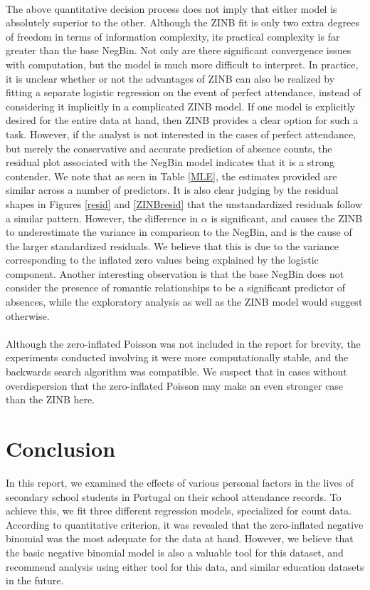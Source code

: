 \documentclass[12pt, titlepage]{article}
\begin{document}
	\paragraph{} The above quantitative decision process does not imply that either model is absolutely superior to the other. Although the ZINB fit is only two extra degrees of freedom in terms of information complexity, its practical complexity is far greater than the base NegBin. Not only are there significant convergence issues with computation, but the model is much more difficult to interpret. In practice, it is unclear whether or not the advantages of ZINB can also be realized by fitting a separate logistic regression on the event of perfect attendance, instead of considering it implicitly in a complicated ZINB model. If one model is explicitly desired for the entire data at hand, then ZINB provides a clear option for such a task. However, if the analyst is not interested in the cases of perfect attendance, but merely the conservative and accurate prediction of absence counts, the residual plot associated with the NegBin model indicates that it is a strong contender. We note that as seen in Table \ref{MLE}, the estimates provided are similar across a number of predictors. It is also clear judging by the residual shapes in Figures \ref{resid} and \ref{ZINBresid} that the unstandardized residuals follow a similar pattern.  However, the difference in $\alpha$ is significant, and causes the ZINB to underestimate the variance in comparison to the NegBin, and is the cause of the larger standardized residuals. We believe that this is due to the variance corresponding to the inflated zero values being explained by the logistic component. Another interesting observation is that the base NegBin does not consider the presence of romantic relationships to be a significant predictor of absences, while the exploratory analysis as well as the ZINB model would suggest otherwise.
	\paragraph{} Although the zero-inflated Poisson was not included in the report for brevity, the experiments conducted involving it were more computationally stable, and the backwards search algorithm was compatible. We suspect that in cases without overdispersion that the zero-inflated Poisson may make an even stronger case than the ZINB here. 
	
	\section{Conclusion}
	In this report, we examined the effects of various personal factors in the lives of secondary school students in Portugal on their school attendance records. To achieve this, we fit three different regression models, specialized for count data. According to quantitative criterion, it was revealed that the zero-inflated negative binomial was the most adequate for the data at hand. However, we believe that the basic negative binomial model is also a valuable tool for this dataset, and recommend analysis using either tool for this data, and similar education datasets in the future.
	
\end{document}
